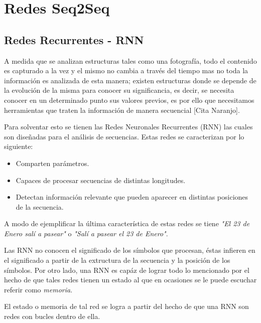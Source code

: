 \documentclass[12pt, letterpaper]{article}
\begin{document}
    \section{Redes Seq2Seq}
    \subsection{Redes Recurrentes - RNN}
    A medida que se analizan estructuras tales como una fotografía, todo el contenido es capturado a la vez y el mismo no cambia a través del tiempo mas no toda la información es analizada de esta manera; existen estructuras donde se depende de la evolución de la misma para conocer su significancia, es decir, se necesita conocer en un determinado punto sus valores previos, es por ello que necesitamos herramientas que traten la información de manera secuencial [Cita Naranjo].

    Para solventar esto se tienen las Redes Neuronales Recurrentes (RNN) las cuales son diseñadas para el análisis de secuencias. Estas redes se caracterizan por lo siguiente:
    
    \begin{itemize}
        \item Comparten parámetros.
        \item Capaces de procesar secuencias de distintas longitudes.
        \item Detectan información relevante que pueden aparecer en distintas posiciones de la secuencia.
    \end{itemize}
    A modo de ejemplificar la última característica de estas redes se tiene \emph{"El 23 de Enero salí a pasear"} o \emph{"Salí a pasear el 23 de Enero"}. 

    Las RNN no conocen el significado de los símbolos que procesan, éstas infieren en el significado a partir de la extructura de la secuencia y la posición de los símbolos. Por otro lado, una RNN es capáz de lograr todo lo mencionado por el hecho de que tales redes tienen un estado al que en ocasiones se le puede escuchar referir como \emph{memoria}.

    El estado o memoria de tal red se logra a partir del hecho de que una RNN son redes con bucles dentro de ella.
\end{document}
